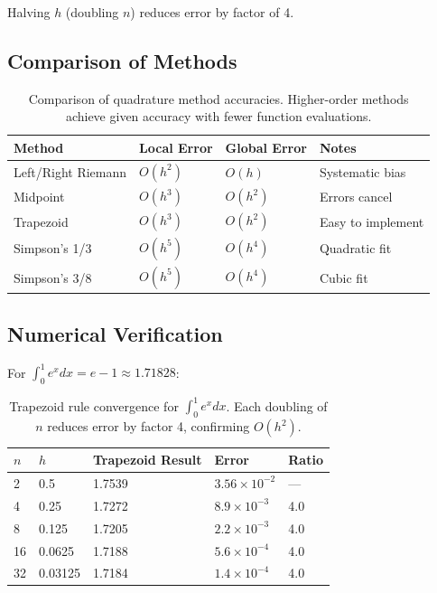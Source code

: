  Halving $h$ (doubling $n$) reduces error by factor of 4.


\subsection{Comparison of Methods}

\begin{table}[ht]
\centering
\begin{tabular}{p{}p{}p{}p{}}
\toprule
\textbf{Method} & \textbf{Local Error} & \textbf{Global Error} & \textbf{Notes} \\
\midrule
Left/Right Riemann & $O(h^2)$ & $O(h)$ & Systematic bias \\
Midpoint & $O(h^3)$ & $O(h^2)$ & Errors cancel \\
Trapezoid & $O(h^3)$ & $O(h^2)$ & Easy to implement \\
Simpson's 1/3 & $O(h^5)$ & $O(h^4)$ & Quadratic fit \\
Simpson's 3/8 & $O(h^5)$ & $O(h^4)$ & Cubic fit \\
\bottomrule
\end{tabular}
\vspace{2em}
\caption{Comparison of quadrature method accuracies. Higher-order methods achieve given accuracy with fewer function evaluations.}
\label{tab:quadrature_comparison}
\end{table}



\subsection{Numerical Verification}

For $\int_0^1 e^x dx = e - 1 \approx 1.71828$:

\begin{table}[ht]
\centering
\begin{tabular}{p{}p{}p{}p{}p{}}
\toprule
$n$ & $h$ & Trapezoid Result & Error & Ratio \\
\midrule
2 & 0.5 & 1.7539 & $3.56 \times 10^{-2}$ & --- \\
4 & 0.25 & 1.7272 & $8.9 \times 10^{-3}$ & 4.0 \\
8 & 0.125 & 1.7205 & $2.2 \times 10^{-3}$ & 4.0 \\
16 & 0.0625 & 1.7188 & $5.6 \times 10^{-4}$ & 4.0 \\
32 & 0.03125 & 1.7184 & $1.4 \times 10^{-4}$ & 4.0 \\
\bottomrule
\end{tabular}
\vspace{2em}
\caption{Trapezoid rule convergence for $\int_0^1 e^x dx$. Each doubling of $n$ reduces error by factor 4, confirming $O(h^2)$.}
\label{tab:trapezoid_convergence}
\end{table}

